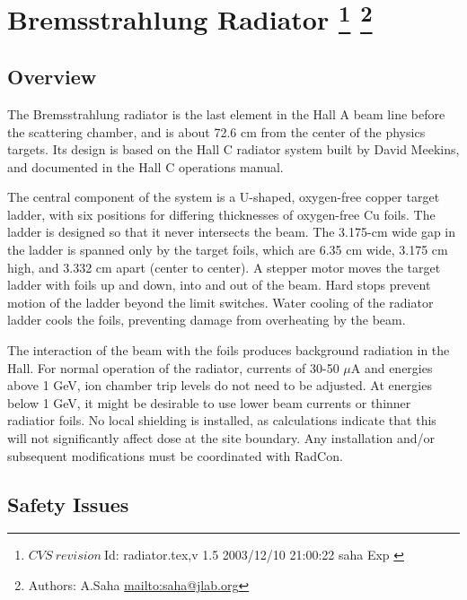 \section[Bremsstrahlung Radiator]{Bremsstrahlung Radiator
\footnote{
  $CVS~revision~ $Id: radiator.tex,v 1.5 2003/12/10 21:00:22 saha Exp $ $
}
\footnote{Authors: A.Saha \url{mailto:saha@jlab.org}}
}

\subsection{Overview}

The Bremsstrahlung radiator is the last element in the Hall A beam line 
before the scattering chamber, and is about 72.6 cm from the center 
of the physics targets.
Its design is based on the Hall C radiator 
system built by David Meekins, and documented in the Hall C operations
manual.

The central component of the system is a U-shaped, oxygen-free copper target
ladder, with six positions for differing thicknesses of oxygen-free Cu foils.
The ladder is designed so that it never intersects the beam.
The 3.175-cm wide gap in the ladder is spanned only by 
the target foils, which are 6.35 cm wide, 3.175 cm high,
and 3.332 cm apart (center to center).
A stepper motor moves the target ladder with foils up and down,
into and out of the beam.
Hard stops prevent motion of the ladder beyond the limit switches.
Water cooling of the radiator ladder cools the foils, preventing
damage from overheating by the beam.

The interaction of the beam with the foils produces
background radiation in the Hall.
For normal operation of the radiator, currents of 30-50 $\mu$A and energies 
above 1 GeV, ion chamber trip levels do not need to be adjusted. At energies 
below 1 GeV, it might be desirable to use lower beam currents or thinner 
radiatior foils. 
No local shielding is installed, as calculations indicate
that this will not significantly affect dose at the site boundary.
Any installation and/or subsequent modifications must be coordinated
with RadCon.

\begin{safetyen}{10}{10}
\subsection{Safety Issues}
\end{safetyen}

